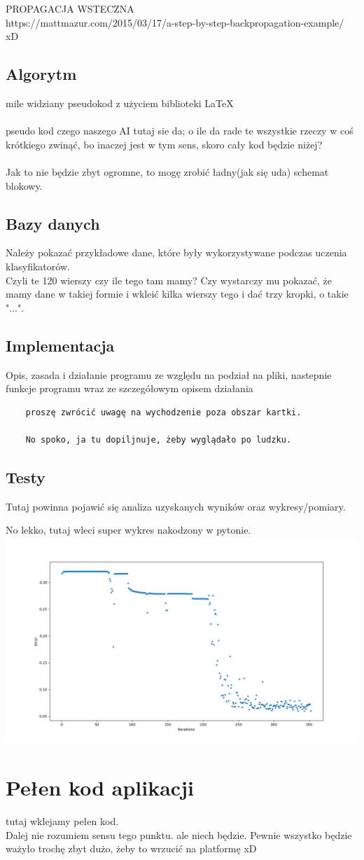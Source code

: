 \documentclass[12pt,a4paper]{article}
\begin{document}
	PROPAGACJA WSTECZNA \\
	https://mattmazur.com/2015/03/17/a-step-by-step-backpropagation-example/ \\
	xD\\
	\subsection*{Algorytm}
	mile widziany pseudokod z użyciem biblioteki \LaTeX
	\\
	\\
	pseudo kod czego naszego AI tutaj sie da; o ile da rade te wszystkie rzeczy w coś krótkiego zwinąć, bo inaczej jest w tym sens, skoro cały kod będzie niżej?\\
	\\
	Jak to nie będzie zbyt ogromne, to mogę zrobić ładny(jak się uda) schemat blokowy.
	\subsection*{Bazy danych}
	Należy pokazać przykładowe dane, które były wykorzystywane podczas uczenia klasyfikatorów.
	\\
	Czyli te 120 wierszy czy ile tego tam mamy? Czy wystarczy mu pokazać, że mamy dane w takiej formie i wkleić kilka wierszy tego i dać trzy kropki, o takie "...".
	\subsection*{Implementacja}
	Opis, zasada i działanie programu ze względu na podział na pliki, nastepnie	funkcje programu wraz ze szczegółowym opisem działania
	\begin{verbatim}
	proszę zwrócić uwagę na wychodzenie poza obszar kartki.
	
	No spoko, ja tu dopiljnuje, żeby wyglądało po ludzku.
	\end{verbatim}
	\subsection*{Testy}
	Tutaj powinna pojawić się analiza uzyskanych wyników oraz wykresy/pomiary.
	
	No lekko, tutaj wleci super wykres nakodzony w pytonie. \\
	\includegraphics[scale=0.5]{supa_wykres}
	\newpage
	\section*{Pełen kod aplikacji}
	tutaj wklejamy pełen kod.\\ Dalej nie rozumiem sensu tego punktu. ale niech będzie. Pewnie wszystko będzie ważyło trochę zbyt dużo, żeby to wrzucić na platformę xD
\end{document}
